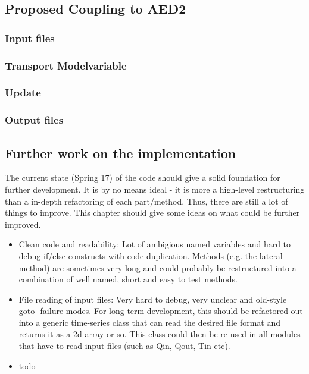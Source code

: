 \documentclass[paper=a4, fontsize=12pt]{article}
\begin{document}
\subsection{Proposed Coupling to AED2}

\subsubsection{Input files}

\subsubsection{Transport Modelvariable}

\subsubsection{Update}

\subsubsection{Output files}

\subsection{Further work on the implementation}
The current state (Spring 17) of the code should give a solid foundation for further development. It is by no means ideal - it is more a high-level restructuring than a in-depth refactoring of each part/method. Thus, there are still a lot of things to improve. This chapter should give some ideas on what could be further improved.

\begin{itemize}
	\item Clean code and readability: Lot of ambigious named variables and hard to debug if/else constructs with code duplication. Methods (e.g. the lateral method) are sometimes very long and could probably be restructured into a combination of well named, short and easy to test methods. 
	
	\item File reading of input files: Very hard to debug, very unclear and old-style goto- failure modes. For long term development, this should be refactored out into a generic time-series class that can read the desired file format and returns it as a 2d array or so. This class could then be re-used in all modules that have to read input files (such as Qin, Qout, Tin etc).
	
	\item todo

\end{itemize}
\end{document}
